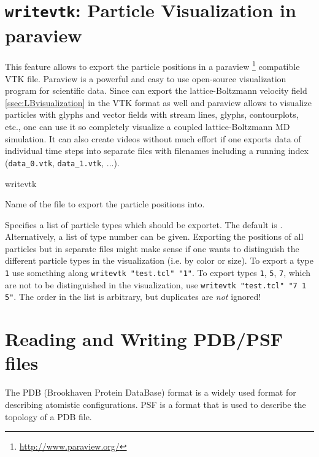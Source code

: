 \section{\texttt{writevtk}: Particle Visualization in paraview}
\label{sec:writevtk}

This feature allows to export the particle positions in a paraview
\footnote{\url{http://www.paraview.org/}} compatible VTK
file. Paraview is a powerful and easy to use open-source visualization
program for scientific data. Since \es can export the
lattice-Boltzmann velocity field \ref{ssec:LBvisualization} in the VTK
format as well and paraview allows to visualize particles with glyphs
and vector fields with stream lines, glyphs, contourplots, etc., one
can use it so completely visualize a coupled lattice-Boltzmann MD
simulation. It can also create videos without much effort if one
exports data of individual time steps into separate files with
filenames including a running index (\texttt{data_0.vtk},
\texttt{data_1.vtk}, ...).

\begin{essyntax}
  writevtk  
\end{essyntax}

\begin{arguments}
\item[\var{filename}]
  Name of the file to export the particle positions into.

\item[\opt{\alt{all \asep \var{type}}}] Specifies a list of particle
  types which should be exportet. The default is
  . Alternatively, a list of type number can be
  given. Exporting the positions of all particles but in separate
  files might make sense if one wants to distinguish the different
  particle types in the visualization (i.e. by color or size).  To
  export a type \texttt{1} use something along \texttt{writevtk
    "test.tcl" "1"}.  To export types \texttt{1}, \texttt{5},
  \texttt{7}, which are not to be distinguished in the visualization,
  use \texttt{writevtk "test.tcl" "7 1 5"}.  The order in the list is
  arbitrary, but duplicates are \emph{not} ignored!
\end{arguments}

\section{Reading and Writing PDB/PSF files}
The PDB (Brookhaven Protein DataBase) format is a widely used format
for describing atomistic configurations. PSF is a format that is used
to describe the topology of a PDB file. 

